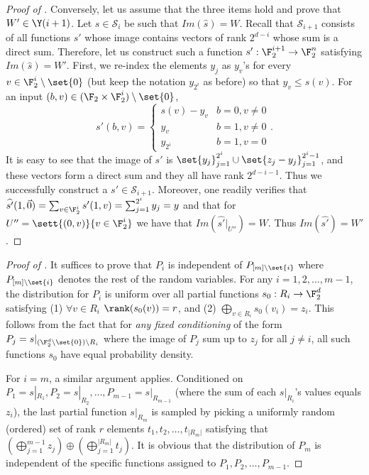 \begin{proof}[Proof of ]
\medskip

Conversely, let us assume that the three items hold and prove that \(W' \in \Y(i+1)\). Let \(s \in \mathcal{S}_i\) be such that \(Im(\widehat{s})=W\). Recall that \(\mathcal{S}_{i+1}\) consists of all functions \(s'\) whose image contains vectors of rank \(2^{d-i}\) whose sum is a direct sum. Therefore, let us construct such a function \(s':\F_2^{i+1} \to \F_2^n\) satisfying \(Im(\widehat{s})=W'\). First, we re-index the elements \(y_j\) as \(y_v\)'s for every \(v \in \F_2^{i} \setminus \set{0}\) (but keep the notation \(y_{2^i}\) as before) so that \(y_v \leq s(v)\). For an input \((b,v)\in (\F_2 \times \F_2^{i}) \setminus \set{0}\),
    \[s'(b,v) = \begin{cases} 
    s(v)-y_v & b=0,v\ne 0 \\
    y_v & b=1, v \ne 0 \\
    y_{2^i} & b=1,v=0 \end{cases}.\]
It is easy to see that the image of \(s'\) is \(\set{y_j}_{j=1}^{2^i} \cup \set{z_j - y_j}_{j=1}^{2^i - 1}\), and these vectors form a direct sum and they all have rank \(2^{d-i-1}\). Thus we successfully construct a \(s' \in \mathcal{S}_{i+1}\). Moreover, one readily verifies that \(\widehat{s'}(1,\vec{0}) = \sum_{v \in \F_2^i} s'(1,v) = \sum_{j=1}^{2^i} y_j = y\) and that for \(U'' = \sett{(0,v)}{v \in \F_2^i}\) we have that \(Im(\widehat{s'}|_{U''}) = W\). Thus \(Im(\widehat{s'}) = W'\).
\end{proof}


\begin{proof}[Proof of ]
    It suffices to prove that \(P_i\) is independent of \(P_{[m] \setminus \set{i}}\) where \(P_{[m] \setminus \set{i}}\) denotes the rest of the random variables. For any \(i =1,2,\dots,m-1 \), the distribution for $P_i$ is uniform over all partial functions \(s_0:R_i \to \F_2^d\) satisfying (1) $\forall v \in R_i$ \(\rank(s_0(v))=r\), and (2) \(\bigoplus_{v \in R_i}s_0(v_i) = z_i\). This follows from the fact that for \emph{any fixed conditioning} of the form \(P_j = s|_{(\F_2^d \setminus \set{0}) \setminus R_i}\) where the image of $P_j$ sum up to \(z_j\) for all \(j \ne i\), all such functions \(s_0\) have equal probability density.

    For \(i=m\), a similar argument applies. Conditioned on \(P_1 = s|_{R_1},P_2 =s|_{R_2},\dots,P_{m-1} = s|_{R_{m-1}}\) (where the sum of each $s|_{R_i}$'s values equals \(z_i\)), the last partial function \(s|_{R_m}\) is sampled by picking a uniformly random (ordered) set of rank \(r\) elements \(t_1,t_2,\dots,t_{|R_m|}\) satisfying that \(\left (\bigoplus_{j=1}^{m-1} z_j \right ) \oplus \left ( \bigoplus_{j=1}^{|R_m|} t_j \right )\). It is obvious that the distribution of $P_m$ is independent of the specific functions assigned to \(P_1,P_2,\dots,P_{m-1}\).
\end{proof}

